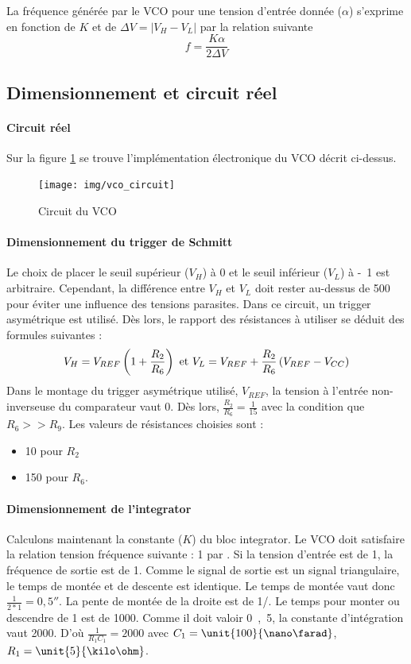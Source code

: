 La fréquence générée par le VCO pour une tension d'entrée donnée ($\alpha$) s'exprime en fonction de $K$ et de $\Delta V = \vert V_H - V_L\vert $ par la relation suivante $$ f = \frac{K\alpha}{2\Delta V}$$

\subsection{Dimensionnement et circuit réel}
\paragraph{Circuit réel}
Sur la figure \ref{fig:circuit_vco} se trouve l'implémentation électronique du VCO décrit ci-dessus.
\begin{figure}[ht]
\centering
\texttt{[image: img/vco\_circuit]}
\caption{Circuit du VCO}
\label{fig:circuit_vco}
\end{figure}
\paragraph{Dimensionnement du trigger de Schmitt}
Le choix de placer le seuil supérieur ($V_H$) à \unit{0}{\volt} et le seuil inférieur ($V_L$) à \unit{-1}{\volt} est arbitraire. Cependant, la différence entre $V_H$ et $V_L$ doit rester au-dessus de \unit{500}{\milli\volt} pour éviter une influence des tensions parasites. Dans ce circuit, un trigger asymétrique est utilisé. Dès lors, le rapport des résistances à utiliser se déduit des formules suivantes : 
$$V_H=V_{REF}\left(1+\frac{R_2}{R_6}\right) \textmd{ et } V_L=V_{REF} + \frac{R_2}{R_6}\left(V_{REF}-V_{CC}\right)$$
Dans le montage du trigger asymétrique utilisé, $V_{REF}$, la tension à l'entrée non-inverseuse du comparateur vaut \unit{0}{\volt}. Dès lors, $\frac{R_2}{R_6}=\frac{1}{15}$
avec la condition que $R_6>>R_9$. Les valeurs de résistances choisies sont :
\begin{itemize}
\item \unit{10}{\kilo\ohm} pour $R_2$
\item \unit{150}{\kilo\ohm} pour $R_6$.
\end{itemize}

\paragraph{Dimensionnement de l'integrator}
Calculons maintenant la constante ($K$) du bloc integrator. Le VCO doit satisfaire la relation tension fréquence suivante : \unit{1}{\milli\volt} par \unit{}{\hertz}. Si la tension d'entrée est de \unit{1}{\milli\volt}, la fréquence de sortie est de \unit{1}{\hertz}. Comme le signal de sortie est un signal triangulaire, le temps de montée et de descente est identique. Le temps de montée vaut donc $\frac{1}{2*1} =  \unit{0,5}{\second}$. La pente de montée de la droite est de \unit{1}{\milli\volt}/\unit{}{\second}. Le temps pour monter ou descendre de \unit{1}{\volt} est de \unit{1000}{\second}. Comme il doit valoir \unit{0,5}{\second}, la constante d'intégration vaut 2000. D'où $\frac{1}{R_1C_1}=2000$ avec $C_1= \unit{100}{\nano\farad}$, $R_1 = \unit{5}{\kilo\ohm}$.
